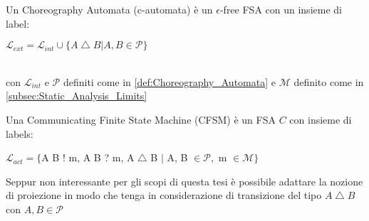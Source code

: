 \begin{definition}\label{def:Choreography_Automata_Ext}
    Un Choreography Automata (c-automata) è un $\epsilon$-free FSA con un insieme di label:\bigskip \\
    \centerline{$\mathcal{L}_{ext} = \mathcal{L}_{int} \cup \{ A \bigtriangleup B | A, B \in \mathcal{P}\}$} \bigskip \\
    con $\mathcal{L}_{int}$ e $\mathcal{P}$ definiti come in \ref{def:Choreography_Automata} e $\mathcal{M}$ definito come in \ref{subsec:Static_Analysis_Limits}
\end{definition}

\begin{definition}
    Una Communicating Finite State Machine (CFSM) è un FSA $C$ con insieme di labels:
    \bigskip \\
    \centerline{$\mathcal{L}_{act} = \{$A B ! m, A B ? m, A $\bigtriangleup$ B $|$ A, B $ \in \mathcal{P},$ m $ \in \mathcal{M}\}$}
\end{definition}

\begin{remark}
    Seppur non interessante per gli scopi di questa tesi è possibile adattare la nozione di proiezione in modo che tenga in considerazione di transizione del tipo $A \bigtriangleup B$ con $A, B \in \mathcal{P}$
\end{remark}


